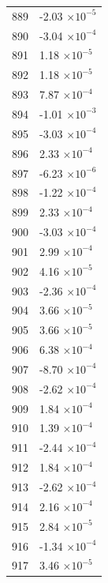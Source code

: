 \documentclass[a4paper,11pt]{article}
\begin{document}
\begin{center}
\begin{longtable}{|R{1.5cm}|R{2.5cm}|}
  889 &        -2.03 $\times 10^{          -5}$ \\
  890 &        -3.04 $\times 10^{          -4}$ \\
  891 &         1.18 $\times 10^{          -5}$ \\
  892 &         1.18 $\times 10^{          -5}$ \\
 {\color{OliveGreen} 893} & {\color{OliveGreen}        7.87 $\times 10^{          -4}$} \\
  894 &        -1.01 $\times 10^{          -3}$ \\
  895 &        -3.03 $\times 10^{          -4}$ \\
  896 &         2.33 $\times 10^{          -4}$ \\
  897 &        -6.23 $\times 10^{          -6}$ \\
  898 &        -1.22 $\times 10^{          -4}$ \\
  899 &         2.33 $\times 10^{          -4}$ \\
  900 &        -3.03 $\times 10^{          -4}$ \\
  901 &         2.99 $\times 10^{          -4}$ \\
  902 &         4.16 $\times 10^{          -5}$ \\
  903 &        -2.36 $\times 10^{          -4}$ \\
  904 &         3.66 $\times 10^{          -5}$ \\
  905 &         3.66 $\times 10^{          -5}$ \\
  906 &         6.38 $\times 10^{          -4}$ \\
  907 &        -8.70 $\times 10^{          -4}$ \\
  908 &        -2.62 $\times 10^{          -4}$ \\
  909 &         1.84 $\times 10^{          -4}$ \\
  910 &         1.39 $\times 10^{          -4}$ \\
  911 &        -2.44 $\times 10^{          -4}$ \\
  912 &         1.84 $\times 10^{          -4}$ \\
  913 &        -2.62 $\times 10^{          -4}$ \\
  914 &         2.16 $\times 10^{          -4}$ \\
  915 &         2.84 $\times 10^{          -5}$ \\
  916 &        -1.34 $\times 10^{          -4}$ \\
  917 &         3.46 $\times 10^{          -5}$ \\

\end{longtable}
\end{center}
\end{document}
